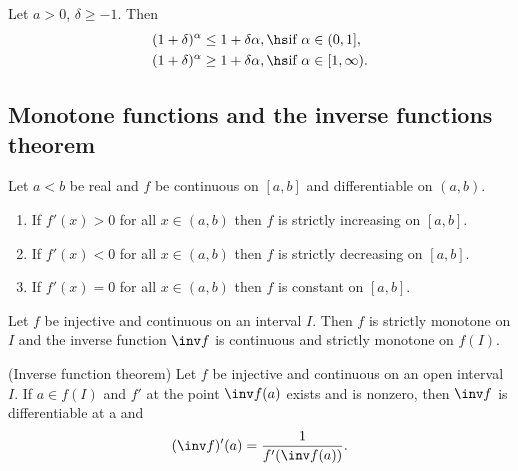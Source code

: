 \documentclass{article}
\begin{document}
\begin{lemma*}
    Let $a>0$, $\delta \geq -1$. Then
    \begin{align*}
        (1+\delta)^\alpha & \leq 1+\delta\alpha,\hs\text{if }\alpha\in(0,1],      \\
        (1+\delta)^\alpha & \geq 1+\delta\alpha,\hs\text{if }\alpha\in[1,\infty).
    \end{align*}
\end{lemma*}

\subsection{Monotone functions and the inverse functions theorem}

\setcounter{theorem}{1}
\begin{theorem}[Ross, 29.7]
    Let $a<b$ be real and $f$ be continuous on $[a,b]$ and differentiable
    on $(a,b)$.
    \begin{enumerate}[label=(\arabic*)]
        \item If $f'(x)>0$ for all $x\in(a,b)$ then $f$ is strictly increasing on $[a,b]$.
        \item If $f'(x)<0$ for all $x\in(a,b)$ then $f$ is strictly decreasing on $[a,b]$.
        \item If $f'(x)=0$ for all $x\in(a,b)$ then $f$ is constant on $[a,b]$.
    \end{enumerate}
\end{theorem}

\begin{theorem}
    Let $f$ be injective and continuous on an interval $I$. Then $f$ is strictly
    monotone on $I$ and the inverse function $\inv f$ is continuous and
    strictly monotone on $f(I)$.
\end{theorem}

\setcounter{theorem}{4}
\begin{theorem}(Inverse function theorem)
    Let $f$ be injective and continuous on an open interval $I$.
    If $a\in f(I)$ and $f'$ at the point $\inv f(a)$ exists and is
    nonzero, then $\inv f$ is differentiable at a and
    \begin{align*}
        (\inv f)'(a) = \frac{1}{f'(\inv f(a))}.
    \end{align*}
\end{theorem}
\end{document}
